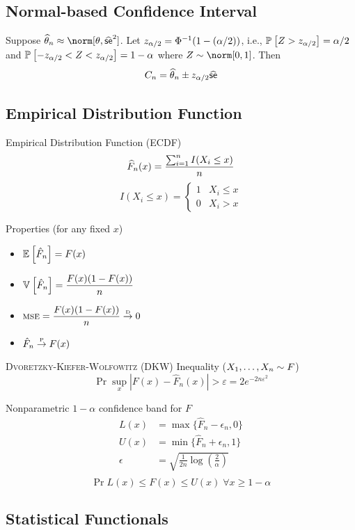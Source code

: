 \documentclass[landscape]{article}
\begin{document}
\begin{multicols*}{2}
\subsection{Normal-based Confidence Interval}

Suppose $\that_n \approx \norm[\theta,\sehat^2]$. Let $z_{\alpha/2} =
\Phi^{-1}(1-(\alpha/2))$, i.e., $\mathbb{P}_{}\left[Z > z_{\alpha/2}\right] = \alpha/2$ and $\mathbb{P}_{}\left[-z_{\alpha/2} < Z <
z_{\alpha/2}\right] = 1-\alpha$ where $Z\dist\norm[0,1]$. 
Then $$C_n = \widehat{\theta}_n \pm z_{\alpha/2}\widehat{\textsf{se}}$$

\subsection{Empirical Distribution Function}

Empirical Distribution Function (ECDF)
$$\widehat{F}_n(x) = \displaystyle\frac{\sum_{i=1}^n I(X_i \le x)}{n}$$
$$I(X_i \le x) = \begin{cases}
  1 & X_i \le x \\
  0 & X_i > x
\end{cases}$$

Properties (for any fixed $x$)
\begin{itemize}
  \item $\mathbb{E}_{}\left[\hat{F}_n\right] = F(x)$
  \item $\mathbb{V}_{}\left[\hat{F}_n\right] = \displaystyle\frac{F(x)(1-F(x))}{n}$
  \item $\textsc{mse} = \displaystyle\frac{F(x)(1-F(x))}{n} \stackrel{\text{\tiny{D}}}{\rightarrow} 0$
  \item $\hat{F}_n \stackrel{\text{\tiny{P}}}{\rightarrow} F(x)$
\end{itemize}

\textsc{Dvoretzky-Kiefer-Wolfowitz} (DKW) Inequality ($X_1,\dots,X_n\sim F$)
$$\Pr{\sup_x\left|F(x)-\hat{F}_n(x)\right| > \varepsilon} =
  2e^{-2n\varepsilon^2}$$

Nonparametric $1-\alpha$ confidence band for $F$
\begin{align*}
  L(x) &= \max\{\hat{F}_n-\epsilon_n, 0\} \\
  U(x) &= \min\{\hat{F}_n+\epsilon_n, 1\} \\
  \epsilon &= 
    \sqrt{\displaystyle\frac{1}{2n}\log\left( \frac{2}{\alpha} \right)} \\
\end{align*}
$$\Pr{L(x) \le F(x) \le U(x) \;\forall x} \ge 1-\alpha$$

\subsection{Statistical Functionals}


\end{multicols*}
\end{document}
